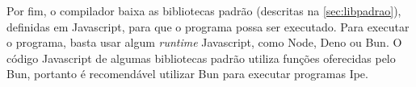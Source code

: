 Por fim, o compilador baixa as bibliotecas padrão (descritas na \autoref{sec:libpadrao}), definidas
em Javascript, para que o programa possa ser executado. Para executar o programa, basta usar algum
\textit{runtime} Javascript, como Node, Deno ou Bun. O código Javascript de algumas bibliotecas
padrão utiliza funções oferecidas pelo Bun, portanto é recomendável utilizar Bun para executar
programas Ipe.
